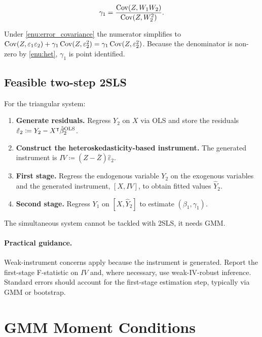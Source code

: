 \begin{equation}
\gamma_{1}=\frac{\operatorname{Cov}(Z,W_{1}W_{2})}{\operatorname{Cov}(Z,W_{2}^{2})}.\label{eq:gamma1_id}
\end{equation}

\begin{remark}
Under \ref{enu:error_covariance} the numerator simplifies to $\operatorname{Cov}(Z,\varepsilon_{1}\varepsilon_{2})+\gamma_{1}\operatorname{Cov}(Z,\varepsilon_{2}^{2})=\gamma_{1}\operatorname{Cov}(Z,\varepsilon_{2}^{2})$.
Because the denominator is non-zero by \ref{enu:het}, $\gamma_{1}$
is point identified. \end{remark}

\subsection{Feasible two-step 2SLS}

\label{subsec:2SLS}

For the triangular system:
\begin{enumerate}
\itemsep2pt
\item \textbf{Generate residuals.} Regress $Y_{2}$ on $X$ via OLS and
store the residuals $\hat{\varepsilon}_{2}\coloneqq Y_{2}-X^{\intercal}\hat{\beta}_{2}^{\text{OLS}}$.
\item \textbf{Construct the heteroskedasticity-based instrument.} The generated
instrument is $IV\coloneqq(Z-\bar{Z})\hat{\varepsilon}_{2}$.
\item \textbf{First stage.} Regress the endogenous variable $Y_{2}$ on
the exogenous variables and the generated instrument, $[X,IV]$, to
obtain fitted values $\hat{Y}_{2}$.
\item \textbf{Second stage.} Regress $Y_{1}$ on $[X,\hat{Y}_{2}]$ to estimate
$(\beta_{1},\gamma_{1})$.
\end{enumerate}
The simultaneous system cannot be tackled with 2SLS, it needs GMM.

\paragraph{Practical guidance.}

Weak-instrument concerns apply because the instrument is generated.
Report the first-stage F-statistic on $IV$ and, where necessary,
use weak-IV-robust inference. Standard errors should account for the
first-stage estimation step, typically via GMM or bootstrap.

\section{GMM Moment Conditions}


